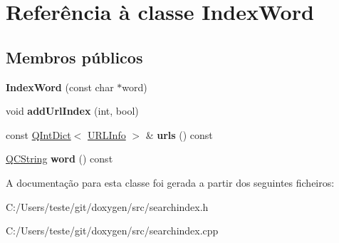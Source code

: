 \hypertarget{class_index_word}{\section{Referência à classe Index\-Word}
\label{class_index_word}
}
\subsection*{Membros públicos}
\begin{DoxyCompactItemize}
\item 
\hypertarget{class_index_word_a57c3aebbf32978973f715adfbf2dd123}{{\bfseries Index\-Word} (const char $\ast$word)}\label{class_index_word_a57c3aebbf32978973f715adfbf2dd123}

\item 
\hypertarget{class_index_word_aec59668f3698d10edfd664e096086091}{void {\bfseries add\-Url\-Index} (int, bool)}\label{class_index_word_aec59668f3698d10edfd664e096086091}

\item 
\hypertarget{class_index_word_a103e5c6e3c2ebf78fdeb427da95df409}{const \hyperlink{class_q_int_dict}{Q\-Int\-Dict}$<$ \hyperlink{struct_u_r_l_info}{U\-R\-L\-Info} $>$ \& {\bfseries urls} () const }\label{class_index_word_a103e5c6e3c2ebf78fdeb427da95df409}

\item 
\hypertarget{class_index_word_a2c052f8584abb7e8711181e45c0ef55e}{\hyperlink{class_q_c_string}{Q\-C\-String} {\bfseries word} () const }\label{class_index_word_a2c052f8584abb7e8711181e45c0ef55e}

\end{DoxyCompactItemize}


A documentação para esta classe foi gerada a partir dos seguintes ficheiros\-:\begin{DoxyCompactItemize}
\item 
C\-:/\-Users/teste/git/doxygen/src/searchindex.\-h\item 
C\-:/\-Users/teste/git/doxygen/src/searchindex.\-cpp\end{DoxyCompactItemize}
